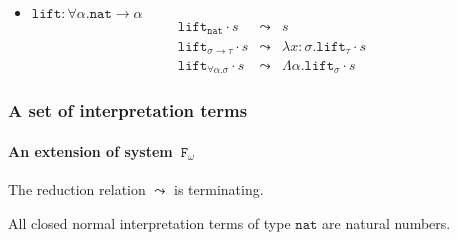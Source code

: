 \documentclass[10pt,presentation,color=names]{beamer}
\newcommand{\Fomega}{\mathtt{F}_\omega}
\newcommand{\arrtype}{\rightarrow}
\newcommand{\quant}[2]{\forall #1.#2}
\newcommand{\app}[2]{#1 \cdot #2}
\newcommand{\abs}[2]{\lambda #1.#2}
\newcommand{\tabs}[2]{\Lambda #1.#2}
\newcommand{\arrW}{\leadsto}
\newcommand{\nat}{\mathtt{nat}}
\newcommand{\lift}{\mathtt{lift}}
\begin{document}
\begin{frame}
\begin{itemize}
  \item $\lift : \forall \alpha . \nat \arrtype \alpha$\pause
    \[
    \begin{array}{rcl}
      \app{\lift_\nat}{s} &\arrW& s\\
      \app{\lift_{\sigma \arrtype \tau}}{s} &\arrW& \abs{x:\sigma}{\app{\lift_{\tau}}{s}}\\
      \app{\lift_{\quant{\alpha}{\sigma}}}{s} &\arrW& \tabs{\alpha}{\app{\lift_{\sigma}}{s}}
    \end{array}
    \]
  \end{itemize}
\end{frame}

%
%

\begin{frame} %
  \frametitle{A set of interpretation terms}
  \framesubtitle{An extension of system~$\Fomega$}
  \begin{theorem}
    The reduction relation $\leadsto$ is terminating.
  \end{theorem}
  \pause
  \begin{corollary}
    All closed normal interpretation terms of type $\nat$ are natural
    numbers.
  \end{corollary}
\end{frame}
\end{document}
